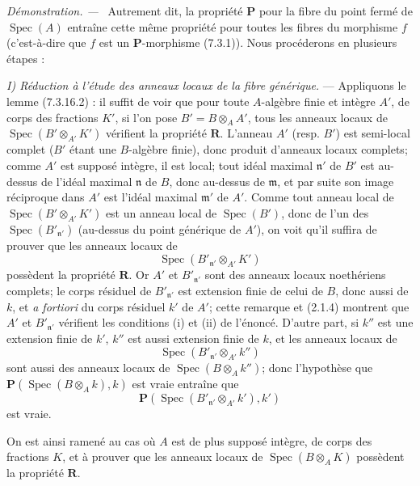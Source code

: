 \documentclass[10pt,oneside]{book}
\newenvironment{proof}{%
  \par\medskip\noindent\textit{Démonstration. ---\ }}{\par}
\begin{document}
\begin{proof}
Autrement dit, la propriété $\boldsymbol P$ pour la fibre du point fermé de
$\operatorname{Spec}(A)$ entraîne cette même propriété pour toutes les
fibres du morphisme $f$ (c'est-à-dire que $f$ est un
$\boldsymbol P$-morphisme (7.3.1)). Nous procéderons en plusieurs étapes :

\emph{I) Réduction à l'étude des anneaux locaux de la fibre générique.} ---
Appliquons le lemme (7.3.16.2) : il suffit de voir que pour toute
$A$-algèbre finie et intègre $A'$, de corps des fractions $K'$, si l'on
pose $B'=B\otimes_A A'$, tous les anneaux locaux de
$\operatorname{Spec}(B'\otimes_{A'}K')$ vérifient la propriété
$\boldsymbol R$. L'anneau $A'$ (resp. $B'$) est semi-local complet ($B'$
étant une $B$-algèbre finie), donc produit d'anneaux locaux complets; comme
$A'$ est supposé intègre, il est local; tout idéal maximal $\mathfrak n'$ de
$B'$ est au-dessus de l'idéal maximal $\mathfrak n$ de $B$, donc au-dessus
de $\mathfrak m$, et par suite son image réciproque dans $A'$ est l'idéal
maximal $\mathfrak m'$ de $A'$. Comme tout anneau local de
$\operatorname{Spec}(B'\otimes_{A'}K')$ est un anneau local de
$\operatorname{Spec}(B')$, donc de l'un des
$\operatorname{Spec}(B'_{\mathfrak n'})$ (au-dessus du point générique de
$A'$), on voit qu'il suffira de prouver que les anneaux locaux de
\[
\operatorname{Spec}(B'_{\mathfrak n'}\otimes_{A'}K')
\]
possèdent la propriété $\boldsymbol R$. Or $A'$ et
$B'_{\mathfrak n'}$ sont des anneaux locaux noethériens complets; le corps
résiduel de $B'_{\mathfrak n'}$ est extension finie de celui de $B$, donc
aussi de $k$, et \emph{a fortiori} du corps résiduel $k'$ de $A'$; cette
remarque et (2.1.4) montrent que $A'$ et $B'_{\mathfrak n'}$ vérifient les
conditions (i) et (ii) de l'énoncé. D'autre part, si $k''$ est une extension
finie de $k'$, $k''$ est aussi extension finie de $k$, et les anneaux locaux
de
\[
\operatorname{Spec}(B'_{\mathfrak n'}\otimes_{A'}k'')
\]
sont aussi des anneaux locaux de $\operatorname{Spec}(B\otimes_A k'')$;
donc l'hypothèse que
$\boldsymbol P(\operatorname{Spec}(B\otimes_A k),k)$ est vraie entraîne que
\[
\boldsymbol P(\operatorname{Spec}(B'_{\mathfrak n'}\otimes_{A'}k'),k')
\]
est vraie.

On est ainsi ramené au cas où $A$ est de plus supposé intègre, de corps des
fractions $K$, et à prouver que les anneaux locaux de
$\operatorname{Spec}(B\otimes_A K)$ possèdent la propriété
$\boldsymbol R$.


\end{proof}
\end{document}
